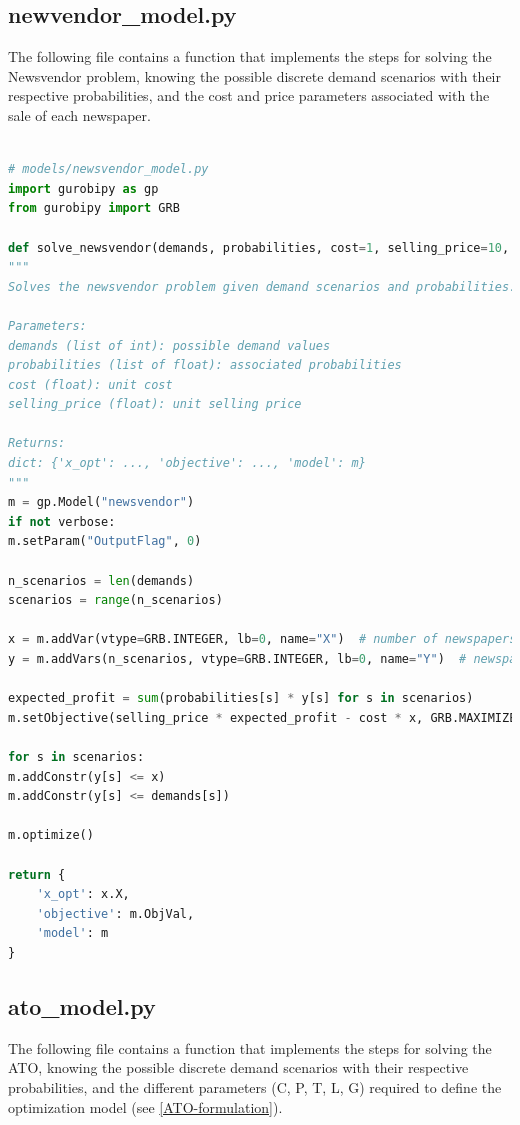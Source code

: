 \documentclass[a4paper,12pt]{article}
\begin{document}
\subsection{newvendor\_model.py}
\noindent The following file contains a function that implements the steps for solving the Newsvendor problem, knowing the possible discrete demand scenarios with their respective probabilities, and the cost and price parameters associated with the sale of each newspaper.

\begin{lstlisting}[language=python,caption={Definition of the function to solve Newsvendor model},label={lst:Newsvendor-model}]

# models/newsvendor_model.py
import gurobipy as gp
from gurobipy import GRB

def solve_newsvendor(demands, probabilities, cost=1, selling_price=10, verbose=False):
"""
Solves the newsvendor problem given demand scenarios and probabilities.

Parameters:
demands (list of int): possible demand values
probabilities (list of float): associated probabilities
cost (float): unit cost
selling_price (float): unit selling price

Returns:
dict: {'x_opt': ..., 'objective': ..., 'model': m}
"""
m = gp.Model("newsvendor")
if not verbose:
m.setParam("OutputFlag", 0)

n_scenarios = len(demands)
scenarios = range(n_scenarios)

x = m.addVar(vtype=GRB.INTEGER, lb=0, name="X")  # number of newspapers to buy
y = m.addVars(n_scenarios, vtype=GRB.INTEGER, lb=0, name="Y")  # newspapers sold per scenario

expected_profit = sum(probabilities[s] * y[s] for s in scenarios)
m.setObjective(selling_price * expected_profit - cost * x, GRB.MAXIMIZE)

for s in scenarios:
m.addConstr(y[s] <= x)
m.addConstr(y[s] <= demands[s])

m.optimize()

return {
	'x_opt': x.X,
	'objective': m.ObjVal,
	'model': m
}


\end{lstlisting}

\subsection{ato\_model.py}
The following file contains a function that implements the steps for solving the ATO, knowing the possible discrete demand scenarios with their respective probabilities, and the different parameters (C, P, T, L, G) required to define the optimization model (see \ref{ATO-formulation}).
\end{document}
